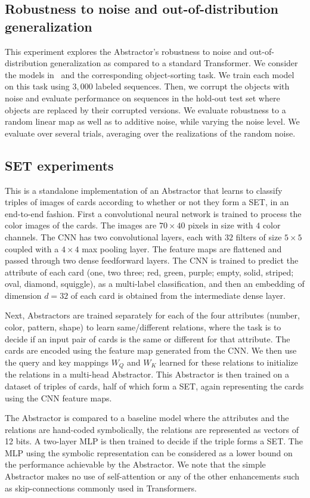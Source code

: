 \subsection{Robustness to noise and out-of-distribution generalization}
This experiment explores the Abstractor's robustness to noise and out-of-distribution generalization as compared to a standard Transformer. We consider the models in~ and the corresponding object-sorting task. We train each model on this task using $3,000$ labeled sequences. Then, we corrupt the objects with noise and evaluate performance on sequences in the hold-out test set where objects are replaced by their corrupted versions. We evaluate robustness to a random linear map as well as to additive noise, while varying the noise level. We evaluate over several trials, averaging over the realizations of the random noise.

\subsection{SET experiments}

This is a standalone implementation of an Abstractor that learns to classify triples of images of cards according 
to whether or not they form a SET, in an end-to-end fashion. First a convolutional neural network is trained to process the color images of the cards. The images are $70 \times 40$ pixels in size with $4$ color channels. The CNN has two convolutional layers, each with $32$ filters of size $5\times 5$ coupled with a $4\times 4$ max pooling layer. The feature maps are flattened and passed through two dense feedforward layers. The CNN is trained to predict the attribute of each card (one, two three; red, green, purple; empty, solid, striped; oval, diamond, squiggle), as a multi-label classification, and then an embedding of dimension $d=32$ of each card is obtained from the intermediate dense layer. 

Next, Abstractors are trained separately for each of the four attributes (number, color, pattern, shape) to learn same/different relations, where the task is to decide if an input pair of cards is the same or different for that attribute. The cards are encoded using the feature map generated from the CNN. We then use the query and key mappings $W_Q$ and $W_K$ learned for these relations to initialize the relations in a multi-head Abstractor. This Abstractor is then trained on a dataset of triples of cards, half of which form a SET, again representing the cards using the CNN feature maps.

The Abstractor is compared to a baseline model where the attributes and the relations are hand-coded symbolically, the relations are represented as vectors of 12 bits. A two-layer MLP is then trained to decide if the triple forms a SET. The MLP using the symbolic representation can be considered as a lower bound on the performance achievable by the Abstractor. We note that the simple Abstractor makes no use of self-attention or any of the other enhancements such as skip-connections commonly used in Transformers.
